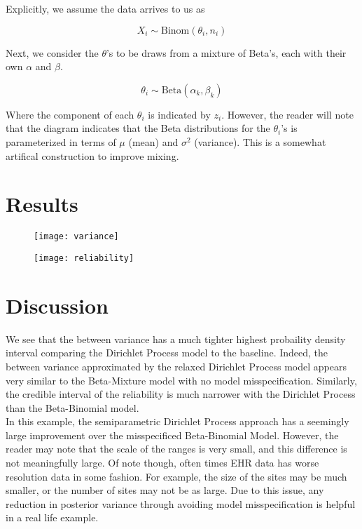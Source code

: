\documentclass{article}
\begin{document}
Explicitly, we assume the data arrives to us as

\begin{equation}\label{eq:data}
    X_i \sim \text{Binom}(\theta_i, n_i)
\end{equation}

Next, we consider the $\theta$'s to be draws from a mixture of Beta's, each with their own $\alpha$ and $\beta$.

\begin{equation}\label{eq:theta}
    \theta_i \sim \text{Beta}(\alpha_k, \beta_k)
\end{equation}

Where the component of each $\theta_i$ is indicated by $z_i$. However, the reader will note that the diagram indicates that the Beta distributions for the $\theta_i$'s is parameterized in terms of $\mu$ (mean) and $\sigma^2$ (variance). This is a somewhat artifical construction to improve mixing.

\section{Results}

\begin{figure}
\texttt{[image: variance]}
\end{figure}

\begin{figure}
\texttt{[image: reliability]}
\end{figure}

\section{Discussion}

We see that the between variance has a much tighter highest probaility density interval comparing the Dirichlet Process model to the baseline. Indeed, the between variance approximated by the relaxed Dirichlet Process model appears very similar to the Beta-Mixture model with no model misspecification. Similarly, the credible interval of the reliability is much narrower with the Dirichlet Process than the Beta-Binomial model. \\

In this example, the semiparametric Dirichlet Process approach has a seemingly large improvement over the misspecificed Beta-Binomial Model. However, the reader may note that the scale of the ranges is very small, and this difference is not meaningfully large. Of note though, often times EHR data has worse resolution data in some fashion. For example, the size of the sites may be much smaller, or the number of sites may not be as large. Due  to this issue, any reduction in posterior variance through avoiding model misspecification is helpful in a real life example.
\end{document}
